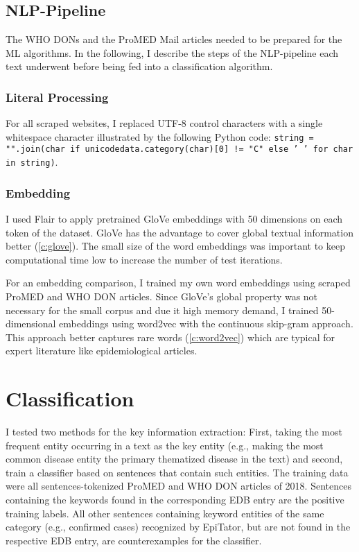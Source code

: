 \subsection{NLP-Pipeline}
  The WHO DONs and the ProMED Mail articles needed to be prepared for the ML algorithms.
  In the following, I describe the steps of the NLP-pipeline each text underwent before being fed into a classification algorithm.

\subsubsection{Literal Processing}
  For all scraped websites, I replaced UTF-8 control characters with a single whitespace character illustrated by the following Python code: \texttt{string = "".join(char if unicodedata.category(char)[0] != "C" else ' ' for char in string)}.

\subsubsection{Embedding}
  I used Flair to apply pretrained GloVe embeddings with 50 dimensions on each token of the dataset. GloVe has the advantage to cover global textual information better (\ref{c:glove}). The small size of the word embeddings was important to keep computational time low to increase the number of test iterations.

  For an embedding comparison, I trained my own word embeddings using scraped ProMED and WHO DON articles.
  Since GloVe's global property was not necessary for the small corpus and due it high memory demand, I trained 50-dimensional embeddings using word2vec with the continuous skip-gram approach.
  This approach better captures rare words (\ref{c:word2vec}) which are typical for expert literature like epidemiological articles.

\section{Classification}
  I tested two methods for the key information extraction: First, taking the most frequent entity occurring in a text as the key entity (e.g., making the most common disease entity the primary thematized disease in the text) and second, train a classifier based on sentences that contain such entities.
  The training data were all sentences-tokenized ProMED and WHO DON articles of 2018.
  Sentences containing the keywords found in the corresponding EDB entry are the positive training labels.
  All other sentences containing keyword entities of the same category (e.g., confirmed cases) recognized by EpiTator, but are not found in the respective EDB entry, are counterexamples for the classifier.

